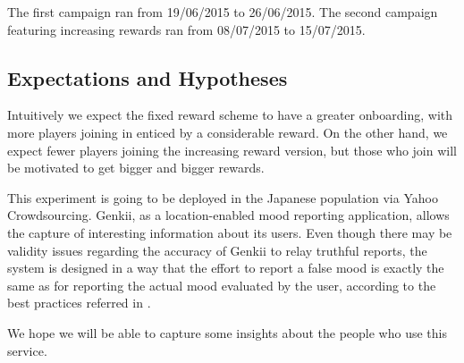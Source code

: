 \documentclass[letterpaper]{article}
\begin{document}
The first campaign ran from 19/06/2015 to 26/06/2015. The second campaign featuring increasing rewards ran from 08/07/2015 to 15/07/2015.

%
%
%
%
%
%

\subsection{Expectations and Hypotheses}

Intuitively we expect the fixed reward scheme to have a greater onboarding, with more players joining in enticed by a considerable reward. On the other hand, we expect fewer players joining the increasing reward version, but those who join will be motivated to get bigger and bigger rewards.

This experiment is going to be deployed in the Japanese population via Yahoo Crowdsourcing. Genkii, as a location-enabled mood reporting application, allows the capture of interesting information about its users. Even though there may be validity issues regarding the accuracy of Genkii to relay truthful reports, the system is designed in a way that the effort to report a false mood is exactly the same as for reporting the actual mood evaluated by the user, according to the best practices referred in \cite{Kittur2008}.

We hope we will be able to capture some insights about the people who use this service.
\end{document}
